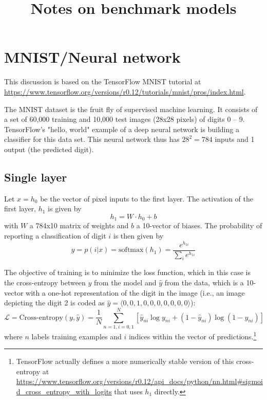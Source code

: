 \documentclass[10pt]{article}
\begin{document}
\title{Notes on benchmark models}
\maketitle

\section{MNIST/Neural network}
This discussion is based on the TensorFlow MNIST tutorial at  \url{https://www.tensorflow.org/versions/r0.12/tutorials/mnist/pros/index.html}.

The MNIST dataset is the fruit fly of supervised machine learning. It consists of a set of 60,000 training and 10,000 test images (28x28 pixels) of digits 0 -- 9. TensorFlow's "hello, world" example of a deep neural network is building a classifier for this data set. This neural network thus has $28^2=784$ inputs and 1 output (the predicted digit).

\subsection{Single layer}
Let $x = h_0$ be the vector of pixel inputs to the first layer. The activation of the first layer, $h_1$ is given by
\begin{equation}
    h_1 = W \cdot h_0 + b
\end{equation}
with $W$ a 784x10 matrix of weights and $b$ a 10-vector of biases. The probability of reporting a classification of digit $i$ is then given by
\begin{equation}
    y = p(i|x) = \mathrm{softmax}(h_1) = \frac{e^{h_{1i}}}{\sum_i e^{h_{1i}}}
\end{equation}


The objective of training is to minimize the loss function, which in this case is the cross-entropy between $y$ from the model and $\hat{y}$ from the data, which is a 10-vector with a one-hot representation of the digit in the image (i.e., an image depicting the digit 2 is coded as $\hat{y} = \langle 0, 0, 1, 0, 0, 0, 0, 0, 0, 0\rangle$):
\begin{equation}
    \mathcal{L} = \textrm{Cross-entropy}(y, \hat{y}) = \frac{1}{N}\sum_{n = 1, i = 0, 1}^N \left[\hat{y}_{ni}\log y_{ni} + (1 - \hat{y}_{ni}) \log (1 - y_{ni}) \right]
\end{equation}
where $n$ labels training examples and $i$ indices within the vector of predictions.\footnote{TensorFlow actually defines a more numerically stable version of this cross-entropy at \url{https://www.tensorflow.org/versions/r0.12/api_docs/python/nn.html#sigmoid_cross_entropy_with_logits} that uses $h_1$ directly.}
\end{document}
